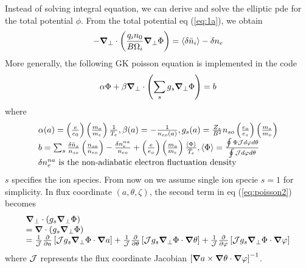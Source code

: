 \documentclass{report}
\newcommand{\bm}[1]{\mbox{\boldmath $#1$}}
\newcommand{\ff}[2]{\frac{#1}{#2}}
\newcommand{\pp}[2]{\frac{\partial{#1}}{\partial{#2}}}
\begin{document}
Instead of solving integral equation, 
we can derive and solve the elliptic pde for the total potential $\phi$.
From the total potential eq (\ref{eq:1a}), we obtain
\begin{equation}
\label{eq:poisson1}
-\bm{\nabla}_\perp \cdot \left( \ff{q_i n_0}{B\Omega_i} \bm{\nabla}_\perp \Phi \right) 
= \langle \delta \bar{n}_i \rangle - \delta n_e
\end{equation}
More generally, the following GK poisson equation is implemented in the code
\begin{equation}
\label{eq:poisson2}
\alpha \Phi + \beta \bm{\nabla}_\perp \cdot \left( \sum_s g_s \bm{\nabla}_\perp \Phi \right) = b
\end{equation}
where
$$
\begin{array} {l}
\alpha(a) = \left(\ff{e}{e_0}\right) 
            \left(\ff{m_o}{m_e}\right) 
            \ff{1}{T_e},
\beta(a) = - \ff{1}{n_{eo}(a)},
g_s(a) = \ff{Z_s}{B^2} n_{so} \left(\ff{e_o}{e_s}\right) \left(\ff{m_s}{m_o}\right) 
\\
b = \sum_s \ff{\delta \bar{n}_s}{n_{so}} \left(\ff{n_{so}}{n_{eo}}\right) - \ff{\delta n_e^{na}}{n_{eo}}
    + \left(\ff{e}{e_o}\right) \left(\ff{m_o}{m_e}\right) \ff{\langle\Phi\rangle}{\bar{T}_e},
\langle\Phi\rangle = \ff{\oint \Phi {\cal J} d\varphi d\theta}{\oint {\cal J} d\varphi d\theta}
\\
\delta n_e^{na} \mbox{ is the non-adiabatic electron fluctuation density}
\end{array}
$$
$s$ specifies the ion species. From now on we assume single ion specie $s=1$ for simplicity.
In flux coordinate $(a, \theta, \zeta)$, the second term in eq (\ref{eq:poisson2}) becomes
\begin{equation}
\label{eq:poisson3}
\begin{array} {l}
\bm{\nabla}_\perp \cdot \left( g_s \bm{\nabla}_\perp \Phi \right)  \\
= \bm{\nabla} \cdot \left( g_s \bm{\nabla}_\perp \Phi \right) \\
= 
\ff{1}{\cal J} \pp{}{a} \left[ {\cal J} g_s \bm{\nabla}_\perp \Phi \cdot \bm{\nabla} a \right]
+
\ff{1}{\cal J} \pp{}{\theta} \left[ {\cal J} g_s \bm{\nabla}_\perp \Phi  \cdot \bm{\nabla }\theta \right]
+
\ff{1}{\cal J} \pp{}{\varphi} \left[ {\cal J} g_s \bm{\nabla}_\perp \Phi  \cdot \bm{\nabla} \varphi \right]
\end{array}
\end{equation}
where ${\cal J}$ represents the flux coordinate Jacobian
$\left[ \bm{\nabla} a \times \bm{\nabla} \theta \cdot \bm{\nabla} \varphi \right]^{-1}$.
\end{document}
